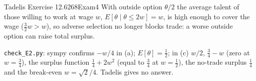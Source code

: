 \begin{exsol}{Tadelis Exercise 12.6}{268}{Exam}{4}
\interp With outside option $\theta/2$ the average talent of those willing to work at wage $w$,
$E[\theta\mid\theta\le2w]=w$, is high enough to cover the wage ($\tfrac32w>w$), so adverse selection no longer blocks
trade: a worse outside option can raise total surplus.

\verify \texttt{check\_E2.py}: sympy confirms $-w/4$ in (a); $E[\theta]=\tfrac12$; in (c) $w/2$,
$\tfrac34-w$ (zero at $w=\tfrac34$), the surplus function $\tfrac14+2w^2$ (equal to $\tfrac34$ at
$w=\tfrac12$), the no-trade surplus $\tfrac14$ and the break-even $w=\sqrt2/4$. Tadelis gives no answer.

\end{exsol}
